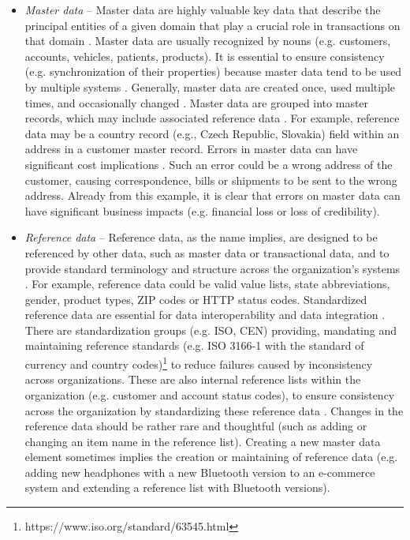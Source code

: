 				\begin{itemize}
					\item \textit{Master data} -- Master data are highly valuable key data that describe the principal entities of a given domain that play a crucial role in transactions on that domain \cite{Mahanti2018}. Master data are usually recognized by nouns \cite{McGilvray2008} (e.g. customers, accounts, vehicles, patients, products). It is essential to ensure consistency (e.g. synchronization of their properties) because master data tend to be used by multiple systems \cite{Mahanti2018}\cite{McGilvray2008}. Generally, master data are created once, used multiple times, and occasionally changed \cite{Mahanti2018}. Master data are grouped into master records, which may include associated reference data \cite{McGilvray2008}. For example, reference data may be a country record (e.g., Czech Republic, Slovakia) field within an address in a customer master record. Errors in master data can have significant cost implications \cite{Mahanti2018}. Such an error could be a wrong address of the customer, causing correspondence, bills or shipments to be sent to the wrong address. Already from this example, it is clear that errors on master data can have significant business impacts (e.g. financial loss or loss of credibility).
					\item \textit{Reference data} -- Reference data, as the name implies, are designed to be referenced by other data, such as master data or transactional data, and to provide standard terminology and structure across the organization's systems \cite{Mahanti2018}\cite{McGilvray2008}. For example, reference data could be valid value lists, state abbreviations, gender, product types, ZIP codes or HTTP status codes. Standardized reference data are essential for data interoperability and data integration \cite{McGilvray2008}. There are standardization groups (e.g. ISO, CEN) \cite{McGilvray2008} providing, mandating and maintaining reference standards (e.g. ISO 3166-1 with the standard of currency and country codes)\footnote{https://www.iso.org/standard/63545.html} to reduce failures caused by inconsistency across organizations. These are also internal reference lists within the organization (e.g. customer and account status codes), to ensure consistency across the organization by standardizing these reference data \cite{Mahanti2018}. Changes in the reference data should be rather rare \cite{Mahanti2018} and thoughtful (such as adding or changing an item name in the reference list). Creating a new master data element sometimes implies the creation or maintaining of reference data \cite{Mahanti2018} (e.g. adding new headphones with a new Bluetooth version to an e-commerce system and extending a reference list with Bluetooth versions).

\end{itemize}

